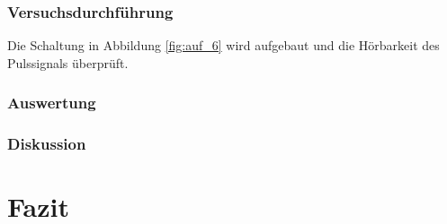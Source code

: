 \documentclass[12pt,a4paper]{article}
\begin{document}
\subsubsection*{Versuchsdurchführung}

Die Schaltung in Abbildung \ref{fig:auf_6} wird aufgebaut und die Hörbarkeit des Pulssignals überprüft.


\subsubsection*{Auswertung}
\subsubsection*{Diskussion}



\section{Fazit}
\end{document}
